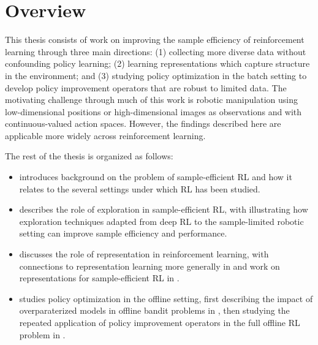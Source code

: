 \section{Overview}

This thesis consists of work on improving the sample efficiency of reinforcement learning through three main directions: (1) collecting more diverse data without confounding policy learning; (2) learning representations which capture structure in the environment; and (3) studying policy optimization in the batch setting to develop policy improvement operators that are robust to limited data.
The motivating challenge through much of this work is robotic manipulation using low-dimensional positions or high-dimensional images as observations and with continuous-valued action spaces.
However, the findings described here are applicable more widely across reinforcement learning.

The rest of the thesis is organized as follows:
\begin{itemize}
    \item {} introduces background on the problem of sample-efficient RL and how it relates to the several settings under which RL has been studied.
    \item {} describes the role of exploration in sample-efficient RL, with  illustrating how exploration techniques adapted from deep RL to the sample-limited robotic setting can improve sample efficiency and performance.
    \item {} discusses the role of representation in reinforcement learning, with connections to representation learning more generally in  and work on representations for sample-efficient RL in .
    \item {} studies policy optimization in the offline setting, first describing the impact of overparaterized models in offline bandit problems in , then studying the repeated application of policy improvement operators in the full offline RL problem in .
\end{itemize}









\printendnotes
